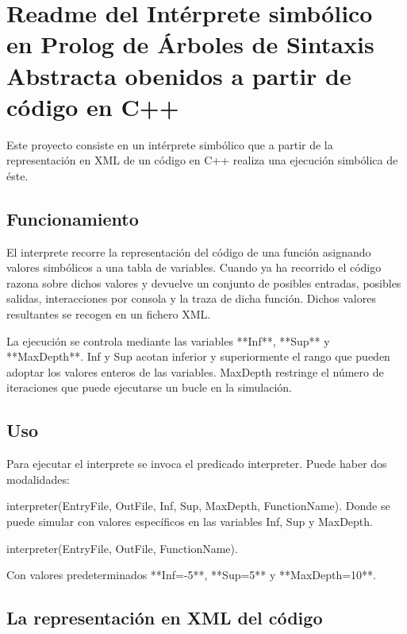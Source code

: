 %
%

\chapter{Readme del Intérprete simbólico en Prolog de Árboles de Sintaxis Abstracta obenidos a partir de código en C++}

\pagestyle{plain}

Este proyecto consiste en un intérprete simbólico que a partir de la representación en XML de un código en C++ realiza una ejecución simbólica de éste.

\section{Funcionamiento}

El interprete recorre la representación del código de una función asignando valores simbólicos a una tabla de variables. Cuando ya ha recorrido el código razona sobre dichos valores y devuelve un conjunto de posibles entradas, posibles salidas, interacciones por consola y la traza de dicha función. Dichos valores resultantes se recogen en un fichero XML.

La ejecución se controla mediante las variables **Inf**, **Sup** y **MaxDepth**. 
Inf y Sup acotan inferior y superiormente el rango que pueden adoptar los valores enteros de las variables.
MaxDepth restringe el número de iteraciones que puede ejecutarse un bucle en la simulación. 

\section{Uso}

Para ejecutar el interprete se invoca el predicado interpreter. Puede haber dos modalidades:

        interpreter(EntryFile, OutFile, Inf, Sup, MaxDepth, FunctionName).
Donde se puede simular con valores específicos en las variables Inf, Sup y MaxDepth.

        interpreter(EntryFile, OutFile, FunctionName).

Con valores predeterminados **Inf=-5**, **Sup=5** y **MaxDepth=10**.

\section{La representación en XML del código}

